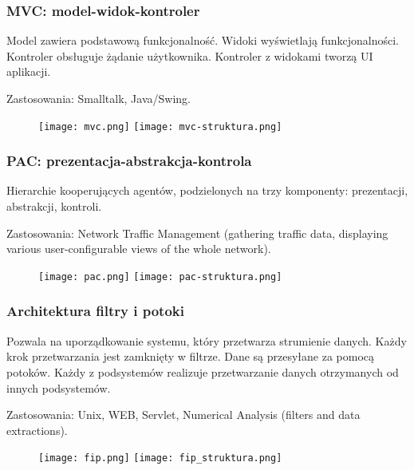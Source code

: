 \documentclass[../main.tex]{subfiles}
\begin{document}
    \subsubsection{MVC: model-widok-kontroler}
    Model zawiera podstawową funkcjonalność. Widoki wyświetlają funkcjonalności. Kontroler obsługuje żądanie użytkownika. Kontroler z widokami tworzą UI aplikacji.

    Zastosowania: Smalltalk, Java/Swing.

    \begin{figure}[H]
        \texttt{[image: mvc.png]}
        \texttt{[image: mvc-struktura.png]}
    \end{figure}



    \subsubsection{PAC: prezentacja-abstrakcja-kontrola}
    Hierarchie kooperujących agentów, podzielonych na trzy komponenty: prezentacji, abstrakcji, kontroli.

    Zastosowania: Network Traffic Management (gathering traffic data, displaying various user-configurable
    views of the whole network).

    \begin{figure}[h]
        \texttt{[image: pac.png]}
        \texttt{[image: pac-struktura.png]}
    \end{figure}



    \subsubsection{Architektura filtry i potoki}

    Pozwala na uporządkowanie systemu, który przetwarza strumienie danych. Każdy krok przetwarzania jest zamknięty w filtrze.
    Dane są przesyłane za pomocą potoków. Każdy z podsystemów realizuje przetwarzanie danych otrzymanych od innych podsystemów.

    Zastosowania: Unix, WEB, Servlet, Numerical Analysis (filters and data extractions).

    \begin{figure}[h]
        \texttt{[image: fip.png]}
        \texttt{[image: fip\_struktura.png]}
    \end{figure}
\end{document}
